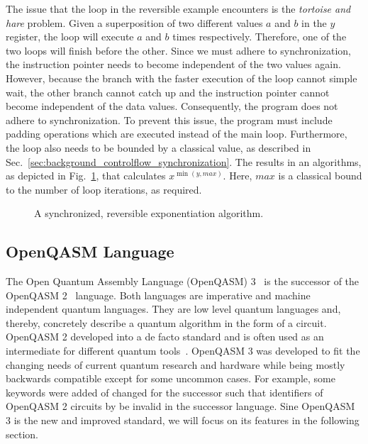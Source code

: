 The issue that the loop in the reversible example encounters is the \emph{tortoise and hare} problem. Given a superposition of two different values $a$ and $b$ in the $y$ register, the loop will execute $a$ and $b$ times respectively. Therefore, one of the two loops will finish before the other. Since we must adhere to synchronization, the instruction pointer needs to become independent of the two values again. However, because the branch with the faster execution of the loop cannot simple wait, the other branch cannot catch up and the instruction pointer cannot become independent of the data values. Consequently, the program does not adhere to synchronization. 
To prevent this issue, the program must include padding operations which are executed instead of the main loop. Furthermore, the loop also needs to be bounded by a classical value, as described in Sec.~\ref{sec:background_controlflow_synchronization}. The results in an algorithms, as depicted in Fig.~\ref{fig:qcm_sync}, that calculates $x^{\min{(y, max)}}$. Here, $max$ is a classical bound to the number of loop iterations, as required.

\begin{figure}[htp]
    \centering     
    
    \caption{A synchronized, reversible exponentiation algorithm.}
    \label{fig:qcm_sync}
\end{figure}

\subsection{OpenQASM Language}
\label{sec:background_qasm}
The Open Quantum Assembly Language (OpenQASM) 3~\cite{CJA*22} is the successor of the OpenQASM 2~\cite{CBSG17} language.
Both languages are imperative and machine independent quantum languages. They are low level quantum languages and, thereby, concretely describe a quantum algorithm in the form of a circuit. OpenQASM 2 developed into a de facto standard and is often used as an intermediate for different quantum tools~\cite{CJA*22}. OpenQASM 3 was developed to fit the changing needs of current quantum research and hardware while being mostly backwards compatible except for some uncommon cases. For example, some keywords were added of changed for the successor such that identifiers of OpenQASM 2 circuits by be invalid in the successor language. Sine OpenQASM 3 is the new and improved standard, we will focus on its features in the following section.

